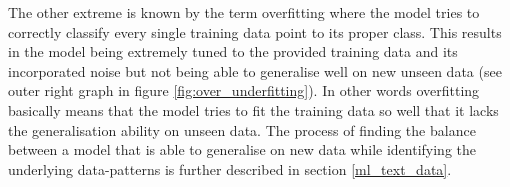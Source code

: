 The other extreme is known by the term overfitting where the model tries to correctly classify every single training data point to its proper class. This results in the model being extremely tuned to the provided training data and its incorporated noise but not being able to generalise well on new unseen data (see outer right graph in figure \ref{fig:over_underfitting}). In other words overfitting basically means that the model tries to fit the training data so well that it lacks the generalisation ability on unseen data. The process of finding the balance between a model that is able to generalise on new data while identifying the underlying data-patterns is further described in section \ref{ml_text_data}.







